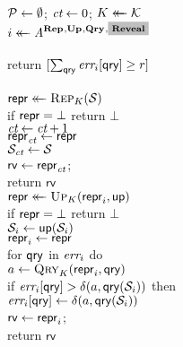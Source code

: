 \begin{figure*}[t]
{
  \\[2pt]
    $\setP \gets \emptyset$; $\ct \gets 0$; $\key \getsr \keys$\\
    $i \getsr \advA^{\REPO,\UPO,\QRYO,\highlighto{\REVO}}$\\
     \\[2.0pt]
    return $[\sum_\qry \err_i[\qry] \geq r]$
  \\[8pt]
  \vspace{-4pt}
}
{
  \oraclev{$\REPO(\col)$}\\[2pt]
    $\pub \getsr \Rep_\key(\col)$\\
    if $\pub = \bot$ return $\bot$\\
    $\ct\gets\ct+1$ \\
    $\pub_\ct \gets \pub$\\
    $\col_\ct \gets \col$\\
    $\mathsf{rv} \gets \pub_\ct$; \\
    return $\mathsf{rv}$
}
{
  \\[2pt]
    $\pub \getsr \Up_\key(\pub_i, \up)$\\
    if $\pub = \bot$ return $\bot$\\
    $\col_i \gets \up(\col_i)$\\
    $\pub_i \gets \pub$\\
    for $\qry$ in $\err_i$ do\\
    \tab $a \gets \Qry_K(\pub_i, \qry)$\\
    \tab if $\err_i[\qry] > \delta(a,\qry(\col_i))$ then\\
    \tab\tab$\err_i[\qry] \gets \delta(a,\qry(\col_i))$\\
    $\mathsf{rv} \gets \pub_i$; \\
    return $\mathsf{rv}$
}
\end{figure*}
